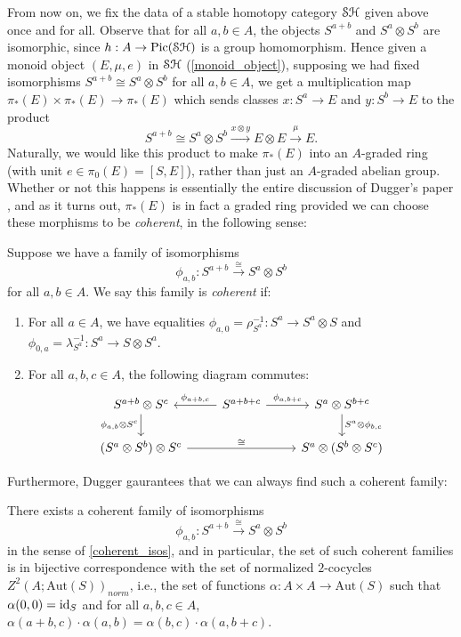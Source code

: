 \documentclass[../main.tex]{subfiles}
\begin{document}
From now on, we fix the data of a stable homotopy category $\mathcal{SH}$ given above once and for all. Observe that for all $a,b\in A$, the objects $S^{a+b}$ and $S^a\otimes S^b$ are isomorphic, since $h:A\to\operatorname{Pic}(\mathcal{SH})$ is a group homomorphism. Hence given a monoid object $(E,\mu,e)$ in $\mathcal{SH}$ (\autoref{monoid_object}), supposing we had fixed isomorphisms $S^{a+b}\cong S^a\otimes S^b$ for all $a,b\in A$, we get a multiplication map $\pi_\ast(E)\times\pi_\ast(E)\to\pi_*(E)$ which sends classes $x:S^a\to E$ and $y:S^b\to E$ to the product
\[S^{a+b}\cong S^a\otimes S^b\xrightarrow{x\otimes y}E\otimes E\xrightarrow\mu E.\]
Naturally, we would like this product to make $\pi_\ast(E)$ into an $A$-graded ring (with unit $e\in\pi_0(E)=[S,E]$), rather than just an $A$-graded abelian group. Whether or not this happens is essentially the entire discussion of Dugger's paper \cite{Dugger_2014}, and as it turns out, $\pi_\ast(E)$ is in fact a graded ring provided we can choose these morphisms to be \emph{coherent}, in the following sense:

\begin{definition}\label{coherent_isos}
	Suppose we have a family of isomorphisms
	\[\phi_{a,b}:S^{a+b}\xrightarrow\cong S^a\otimes S^b\]
	for all $a,b\in A$. We say this family is \emph{coherent} if:
	\begin{enumerate}
		\item For all $a\in A$, we have equalities $\phi_{a,0}=\rho_{S^a}^{-1}:S^a\to S^a\otimes S$ and $\phi_{0,a}=\lambda_{S^a}^{-1}:S^a\to S\otimes S^a$.
		\item For all $a,b,c\in A$, the following diagram commutes:
		\[\begin{tikzcd}
			{S^{a+b}\otimes S^c} & {S^{a+b+c}} & {S^a\otimes S^{b+c}} \\
			{(S^a\otimes S^b)\otimes S^c} && {S^a\otimes(S^b\otimes S^c)}
			\arrow["{\phi_{a+b,c}}"', from=1-2, to=1-1]
			\arrow["{\phi_{a,b+c}}", from=1-2, to=1-3]
			\arrow["{S^a\otimes\phi_{b,c}}", from=1-3, to=2-3]
			\arrow["{\phi_{a,b}\otimes S^c}"', from=1-1, to=2-1]
			\arrow["\cong", from=2-1, to=2-3]
		\end{tikzcd}\]
	\end{enumerate}
\end{definition}

Furthermore, Dugger gaurantees that we can always find such a coherent family:

\begin{theorem}\label{coherent_existence}
	There exists a coherent family of isomorphisms
	\[\phi_{a,b}:S^{a+b}\xrightarrow\cong S^a\otimes S^b\]
	in the sense of \autoref{coherent_isos},
	and in particular, the set of such coherent families is in bijective correspondence with the set of normalized $2$-cocycles $Z^2(A;\mathrm{Aut}(S))_\mathit{norm}$, i.e., the set of functions $\alpha:A\times A\to\mathrm{Aut}(S)$ such that $\alpha(0,0)=\mathrm{id}_S$ and for all $a,b,c\in A$, $\alpha(a+b,c)\cdot\alpha(a,b)=\alpha(b,c)\cdot\alpha(a,b+c)$. 
\end{theorem}
\end{document}
